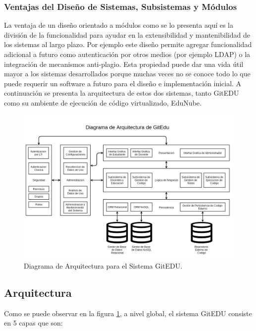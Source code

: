 \subsubsection{Ventajas del Diseño de Sistemas, Subsistemas y Módulos}
La ventaja de un diseño orientado a módulos como se lo presenta aquí es la división de la funcionalidad para ayudar en la extensibilidad y mantenibilidad de los sistemas al largo plazo. Por ejemplo este diseño permite agregar funcionalidad adicional a futuro como autenticación por otros medios (por ejemplo LDAP) o la integración de mecanismos anti-plagio. Esta propiedad puede dar una vida útil mayor a los sistemas desarrollados porque muchas veces no se conoce todo lo que puede requerir un software a futuro para el diseño e implementación inicial. A continuación se presenta la arquitectura de estos dos sistemas, tanto GitEDU como su ambiente de ejecución de código virtualizado, EduNube.

\pagebreak

\begin{landscape}

	\begin{figure}
	  \begin{center}
	    \includegraphics[width=1.0\textwidth]{Figures/arq_ge.png}
	  \end{center}
	  \caption{Diagrama de Arquitectura para el Sistema GitEDU.}
	  \label{arq_ge}
	\end{figure}

\end{landscape}

\subsection{Arquitectura}
Como se puede observar en la figura \ref{arq_ge}, a nivel global, el sistema GitEDU consiste en 5 capas que son:

